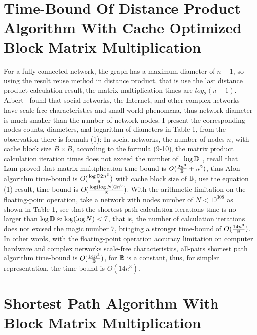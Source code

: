 \documentclass[review]{cvpr}
\begin{document}

\section{Time-Bound Of Distance Product Algorithm With Cache Optimized Block Matrix Multiplication}

For a fully connected network, the graph has a maximum diameter of $n-1$, so using the result reuse method in distance product, that is use the last distance product calculation result, the matrix multiplication times are $log_2(n-1)$.
Albert~\cite{albert1999diameter} found that social networks, the Internet, and other complex networks have scale-free characteristics and small-world phenomena, thus network diameter is much smaller than the number of network nodes.
I present the corresponding nodes counts, diameters, and logarithm of diameters in Table 1, from the observation there is formula (1):
In social networks, the number of nodes $n$, with cache block size $B\times B$, according to the formula (9-10), the matrix product calculation iteration times does not exceed the number of $\lceil{\log{\Bbb D}}\rceil$, recall that Lam \etal proved that matrix multiplication time-bound is \(O({2n^3 \over \Bbb B}+{n^2})\),
thus Alon \etal algorithm time-bound is \(O({\log{\Bbb D}2n^3\over{ \Bbb B}})\) with cache block size of $\Bbb B$, use the equation (1) result, time-bound is \(O({\log(\log{N})2n^3\over \Bbb B})\).
With the arithmetic limitation on the floating-point operation, \eg take a network with nodes number of $N<10^{308}$
as shown in Table 1, see that the shortest path calculation iterations time is no larger than $\log{\Bbb D} \approx \log(\log{N})<7$, that is, the number of calculation iterations does not exceed the magic number $7$,
bringing a stronger time-bound of \(O({14n^3\over {\Bbb B}})\).
In other words, with the floating-point operation accuracy limitation on computer hardware and complex networks scale-free characteristics, all-pairs shortest path algorithm time-bound is \(O({14n^3\over \Bbb B})\), for $\Bbb B$ is a constant, thus, for simpler representation, the time-bound is \(O(14n^3)\).




\section{Shortest Path Algorithm With Block Matrix Multiplication}
\end{document}
